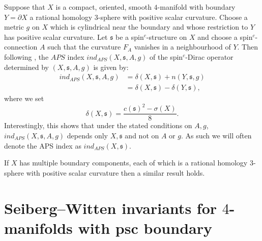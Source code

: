 \documentclass{amsart}
\theoremstyle{definition}
\theoremstyle{remark}
\numberwithin{equation}{section}
\begin{document}
Suppose that $X$ is a compact, oriented, smooth $4$-manifold with boundary $Y = \partial X$ a rational homology $3$-sphere with positive scalar curvature. Choose a metric $g$ on $X$ which is cylindrical near the boundary and whose restriction to $Y$ has positive scalar curvature. Let $\mathfrak{s}$ be a spin$^c$-structure on $X$ and choose a spin$^c$-connection $A$ such that the curvature $F_A$ vanishes in a neighbourhood of $Y$. Then following \cite[]{man1}, the $APS$ index $ind_{APS}(X , \mathfrak{s} , A ,  g)$ of the spin$^c$-Dirac operator determined by $(X,\mathfrak{s},A,g)$ is given by:
\begin{align*}
ind_{APS}(X , \mathfrak{s} , A , g) &= \delta(X , \mathfrak{s}) + n(Y , \mathfrak{s} , g) \\
&= \delta(X , \mathfrak{s}) - \delta(Y , \mathfrak{s}),
\end{align*}
where we set
\[
\delta(X , \mathfrak{s}) = \frac{ c(\mathfrak{s})^2 - \sigma(X) }{8}.
\]
Interestingly, this shows that under the stated conditions on $A,g$, $ind_{APS}(X,\mathfrak{s},A,g)$ depends only $X,\mathfrak{s}$ and not on $A$ or $g$. As such we will often denote the APS index as $ind_{APS}(X,\mathfrak{s})$.

If $X$ has multiple boundary components, each of which is a rational homology $3$-sphere with positive scalar curvature then a similar result holds. 


\section{Seiberg--Witten invariants for $4$-manifolds with psc boundary}\label{sec:swpsc}
\end{document}

